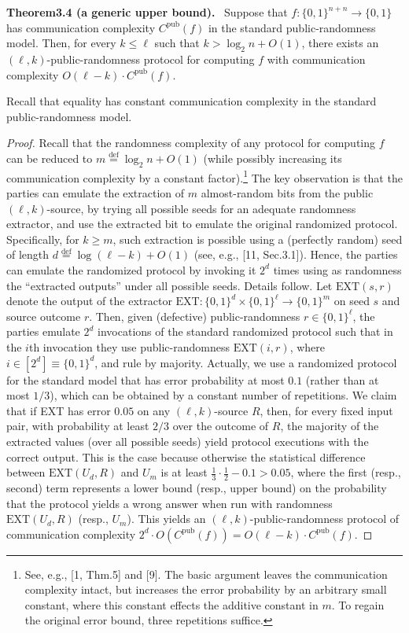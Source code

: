 \documentclass[10pt,a4paper]{article}
\newenvironment{authorclaim}[1]{\par\medskip\noindent\textbf{#1.}\ }{\par\medskip}
\begin{document}
\begin{authorclaim}{Theorem3.4 (a generic upper bound)}
Suppose that $f:\{0,1\}^{n+n}\to\{0,1\}$ has communication complexity $C^{\mathrm{pub}}(f)$ in the standard public-randomness model. Then, for every $k\le\ell$ such that $k>\log_2n+O(1)$, there exists an $(\ell,k)$-public-randomness protocol for computing $f$ with communication complexity $O(\ell-k)\cdot C^{\mathrm{pub}}(f)$.
\end{authorclaim}
Recall that equality has constant communication complexity in the standard public-randomness model.
\begin{proof}
Recall that the randomness complexity of any protocol for computing $f$ can be reduced to $m\stackrel{\mathrm{def}}=\log_2n+O(1)$ (while possibly increasing its communication complexity by a constant factor).\footnote{See, e.g., [1, Thm.5] and [9]. The basic argument leaves the communication complexity intact, but increases the error probability by an arbitrary small constant, where this constant effects the additive constant in $m$. To regain the original error bound, three repetitions suffice.} The key observation is that the parties can emulate the extraction of $m$ almost-random bits from the public $(\ell,k)$-source, by trying all possible seeds for an adequate randomness extractor, and use the extracted bit to emulate the original randomized protocol. Specifically, for $k\ge m$, such extraction is possible using a (perfectly random) seed of length $d\stackrel{\mathrm{def}}=\log(\ell-k)+O(1)$ (see, e.g., [11, Sec.3.1]). Hence, the parties can emulate the randomized protocol by invoking it $2^d$ times using as randomness the ``extracted outputs'' under all possible seeds. Details follow.
Let $\mathrm{EXT}(s,r)$ denote the output of the extractor $\mathrm{EXT}:\{0,1\}^d\times\{0,1\}^\ell\to\{0,1\}^m$ on seed $s$ and source outcome $r$. Then, given (defective) public-randomness $r\in\{0,1\}^\ell$, the parties emulate $2^d$ invocations of the standard randomized protocol such that in the $i$th invocation they use public-randomness $\mathrm{EXT}(i,r)$, where $i\in[2^d]\equiv\{0,1\}^d$, and rule by majority. Actually, we use a randomized protocol for the standard model that has error probability at most $0.1$ (rather than at most $1/3$), which can be obtained by a constant number of repetitions.
We claim that if EXT has error $0.05$ on any $(\ell,k)$-source $R$, then, for every fixed input pair, with probability at least $2/3$ over the outcome of $R$, the majority of the extracted values (over all possible seeds) yield protocol executions with the correct output. This is the case because otherwise the statistical difference between $\mathrm{EXT}(U_d,R)$ and $U_m$ is at least $\frac13\cdot\frac12-0.1>0.05$, where the first (resp., second) term represents a lower bound (resp., upper bound) on the probability that the protocol yields a wrong answer when run with randomness $\mathrm{EXT}(U_d,R)$ (resp., $U_m$). This yields an $(\ell,k)$-public-randomness protocol of communication complexity $2^d\cdot O(C^{\mathrm{pub}}(f))=O(\ell-k)\cdot C^{\mathrm{pub}}(f)$.
\end{proof}
\end{document}
